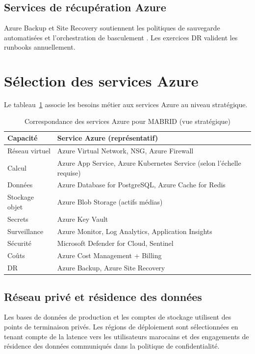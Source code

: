 \subsection{Services de récupération Azure}

Azure Backup et Site Recovery soutiennent les politiques de sauvegarde automatisées et l'orchestration de basculement \parencite{microsoftASR}. Les exercices DR valident les runbooks annuellement.

\section{Sélection des services Azure}

Le tableau~\ref{tab:azure-services} associe les besoins métier aux services Azure au niveau stratégique.

\begin{table}[H]
  \centering
  \caption{Correspondance des services Azure pour MABRID (vue stratégique)}
  \label{tab:azure-services}
  \begin{tabularx}{\textwidth}{@{}lX@{}}
    \toprule
    \textbf{Capacité} & \textbf{Service Azure (représentatif)} \\
    \midrule
    Réseau virtuel & Azure Virtual Network, NSG, Azure Firewall \\
    Calcul & Azure App Service, Azure Kubernetes Service (selon l'échelle requise) \\
    Données & Azure Database for PostgreSQL, Azure Cache for Redis \\
    Stockage objet & Azure Blob Storage (actifs médias) \\
    Secrets & Azure Key Vault \\
    Surveillance & Azure Monitor, Log Analytics, Application Insights \\
    Sécurité & Microsoft Defender for Cloud, Sentinel \\
    Coûts & Azure Cost Management + Billing \\
    DR & Azure Backup, Azure Site Recovery \\
    \bottomrule
  \end{tabularx}
\end{table}

\subsection{Réseau privé et résidence des données}

Les bases de données de production et les comptes de stockage utilisent des points de terminaison privés. Les régions de déploiement sont sélectionnées en tenant compte de la latence vers les utilisateurs marocains et des engagements de résidence des données communiqués dans la politique de confidentialité.

